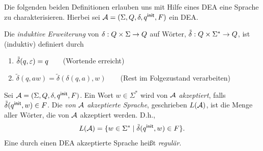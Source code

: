 Die folgenden beiden Definitionen erlauben uns mit Hilfe eines \acs*{DEA} eine Sprache zu charakterisieren.
Hierbei sei $\mathcal{A}= (\Sigma, Q,\delta,q^\mathsf{init},F)$ ein \acs*{DEA}.
\begin{Def}\label{def:2.deltaschlange}
        Die \emph{induktive Erweiterung} von $\delta:Q\x\Sigma\->Q$ auf Wörter, $\tilde{\delta}: Q\x\Sigma^*\->Q$, ist (induktiv) definiert durch
  \begin{enumerate}
  \item $\tilde\delta(q,\varepsilon) =q$\ \ \ \  (Wortende erreicht)
  \item $\tilde\delta(q,aw)=\tilde\delta(\delta(q,a),w)$\ \ \ \ (Rest im Folgezustand verarbeiten)
  \qedhere
  \end{enumerate}
\end{Def}
\begin{Def}\label{def:2.sprache}
        Sei $\mathcal{A}=(\Sigma, Q,\delta,q^\mathsf{init},F)$. 
        Ein Wort $w\in\Sigma^*$ wird von $\mathcal{A}$ \emph{akzeptiert}, falls $\tilde\delta(q^\mathsf{init},w)\in F$.
        Die \emph{von $\mathcal{A}$ akzeptierte Sprache}, geschrieben $L(\mathcal{A})$, ist die Menge aller Wörter, die von $\mathcal{A}$ akzeptiert werden. D.h., 
        \[ L(\mathcal{A}) = \{ w\in\Sigma^* \mid \tilde\delta(q^\mathsf{init},w)\in F \}. \]
        Eine durch einen \acs*{DEA} akzeptierte Sprache heißt \emph{regulär}.
\end{Def}

